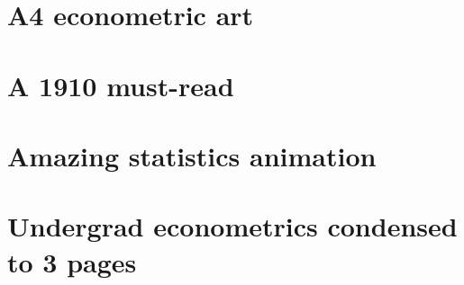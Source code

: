 \documentclass[letterpaper,10pt,english]{sphinxmanual}
\begin{document}
\section{A4 econometric art}
\label{\detokenize{tweets:a4-econometric-art}}



\section{A 1910 must-read}
\label{\detokenize{tweets:a-1910-must-read}}



\section{Amazing statistics animation}
\label{\detokenize{tweets:amazing-statistics-animation}}



\section{Undergrad econometrics condensed to 3 pages}
\label{\detokenize{tweets:undergrad-econometrics-condensed-to-3-pages}}
 
\end{document}
